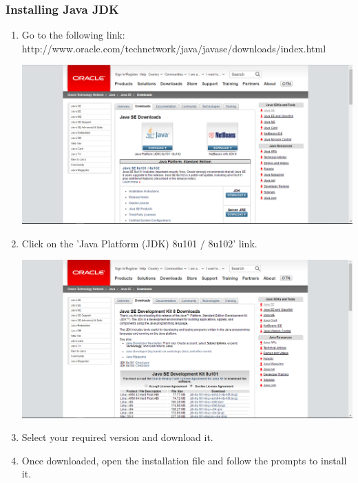 \documentclass[a4paper,12pt]{article}
\begin{document}
\subsubsection{Installing Java JDK}
\begin{enumerate}
\item  Go to the following link: http://www.oracle.com/technetwork/java/javase/downloads/index.html

\includegraphics[width=0.9\linewidth, center]{./Installation/Java_download_1.PNG}\\[0.4cm]

\item Click on the 'Java Platform (JDK) 8u101 / 8u102' link.

\includegraphics[width=0.9\linewidth, center]{./Installation/Java_download_2.PNG}\\[0.4cm]

\item Select your required version and download it.
\item Once downloaded, open the installation file and follow the prompts to install it.
\end{enumerate}
\end{document}
